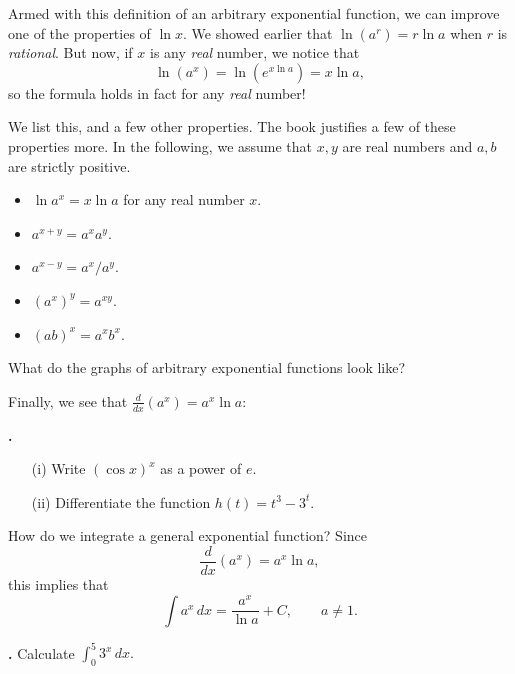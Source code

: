 \documentclass[t]{beamer}
\theoremstyle{plain}
\theoremstyle{definition}
\newcounter{heading}
\newcommand{\newhead}[1]{\medskip\stepcounter{heading}\noindent\textbf{\hspace{0.2cm}{#1}.}}
\begin{document}
\begin{frame}
\noindent Armed with this definition of an arbitrary exponential function, we can improve one of the properties of $\ln x$.  We showed earlier that $\ln (a^{r}) = r\ln a$ when $r$ is \emph{rational}.  But now,
if $x$ is any \emph{real} number, we notice that
\[ \ln(a^{x}) = \ln(e^{x \ln a}) = x \ln a,\]
so the formula holds in fact for any \emph{real} number!  \pause

\vspace*{.1cm}

\noindent We list this, and a few other properties.  The book justifies a few of these properties more.  In the following, we assume that $x,y$ are real numbers and $a,b$ are strictly positive.
\begin{itemize}[<+->]
\item $\ln a^{x} = x\ln a$ for any real number $x$.
\item $a^{x+y} = a^{x}a^{y}.$
\item $a^{x-y} = a^{x}/a^{y}$.
\item $(a^{x})^{y} = a^{xy}$.
\item $(ab)^{x} = a^{x}b^{x}$.
\end{itemize}
\end{frame}

\begin{frame}
\noindent What do the graphs of arbitrary exponential functions look like?\pause

\vspace*{1cm}

\noindent Finally, we see that $\frac{d}{dx}(a^{x}) = a^{x}\ln a$:\pause

\vspace*{1cm}

\newhead{Examples}
\begin{enumerate}[<+->]
\item[(i)] Write $(\cos x)^{x}$ as a power of $e$.
\vspace*{.3cm}
\item[(ii)] Differentiate the function $h(t) = t^{3} - 3^{t}$.
\end{enumerate}
\end{frame}

\begin{frame}
\noindent How do we integrate a general exponential function? \pause Since
\[ \frac{d}{dx}(a^{x}) = a^{x} \ln a,\]
this implies that
\[ \int a^{x}\, dx = \frac{a^{x}}{\ln a} + C, \qquad a \neq 1.\]\pause

\newhead{Example} Calculate $\int_{0}^{5}3^{x}\, dx.$ 


\end{frame}
\end{document}
